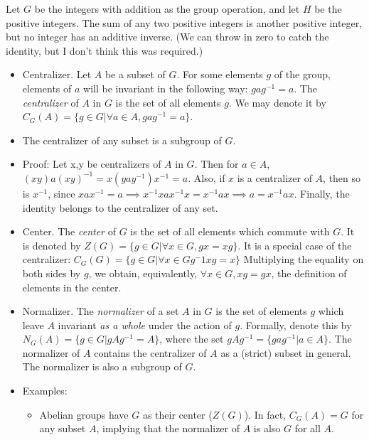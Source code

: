 \documentclass[1    0pt, answers]{exam} \renewcommand{\baselinestretch}{1.05}
\theoremstyle{plain}
\theoremstyle{definition}
\begin{document}
\begin{questions}
\begin{solution}
Let $G$ be the integers with addition as the group operation, and let $H$ be the positive integers. The sum of any two positive integers is another positive integer, but no integer has an additive inverse. (We can throw in zero to catch the identity, but I don't think this was required.)
\end{solution}

\begin{itemize}
\item Centralizer. Let $A$ be a subset of $G$. For some elements $g$ of the group, elements of $a$ will be invariant in the following way: $g a g^{-1} = a$. The \emph{centralizer} of $A$ in $G$ is the set of all elements $g$. We may denote it by $C_{G}(A) = \{ g \in G | \forall a \in A,  g a g^{-1} = a \}$.
\item The centralizer of any subset is a subgroup of $G$.
\item Proof: Let x,y be centralizers of $A$ in $G$. Then for $a \in A$, $(xy) a (xy)^{-1} = x(yay^{-1})x^{-1} = a$. Also, if $x$ is a centralizer of $A$, then so is $x^{-1}$, since $x a x^{-1} = a \implies x^{-1}x a x^{-1}x = x^{-1} a x \implies a = x^{-1} a x$. Finally, the identity belongs to the centralizer of any set.
\item Center. The \emph{center} of $G$ is the set of all elements which commute with $G$. It is denoted by $Z(G) = \{ g \in G | \forall x \in G, gx = xg \}$. It is a special case of the centralizer: $C_G (G) = \{ g \in G | \forall x \in G g^-1 x g = x \}$ Multiplying the equality on both sides by $g$, we obtain, equivalently, $\forall x \in G, x g = g x $, the definition of elements in the center.
\item Normalizer. The \emph{normalizer} of a set $A$ in $G$ is the set of elements $g$ which leave $A$ invariant \emph{as a whole}  under the action of $g$. Formally, denote this by $N_G (A) = \{ g \in G | g A g^{-1} = A \}$, where the set $g A g^{-1} = \{ g a g^{-1} | a \in A \}$. The normalizer of $A$ contains the centralizer of $A$ as a (strict) subset in general. The normalizer is also a subgroup of $G$.
\item Examples:
\begin{itemize}
    \item Abelian groups have $G$ as their center ($Z(G)$). In fact, $C_G (A) = G$ for any subset $A$, implying that the normalizer of $A$ is also $G$ for all $A$.

\end{itemize}
\end{itemize}
\end{questions}
\end{document}
